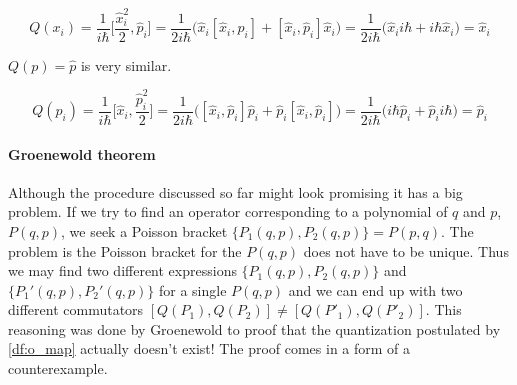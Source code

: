 \begin{equation*}
    Q(x_{i}) = \frac{1}{i \hbar}\bigg[\frac{\hat{x}_{i}^{2}}{2}, \hat{p}_{i}\bigg] = 
    \frac{1}{2 i \hbar} \big(\hat{x}_{i} [\hat{x}_{i}, \hat{p}_{i}] + [\hat{x}_{i}, \hat{p}_{i}] \hat{x}_{i}\big) =
    \frac{1}{2 i \hbar} \big(\hat{x}_{i} i \hbar + i \hbar \hat{x}_{i}\big) = \hat{x}_{i}
\end{equation*}

 $Q(p) = \hat{p}$ is very similar.

\begin{equation*}
    Q(p_{i}) = \frac{1}{i \hbar}\bigg[\hat{x}_{i}, \frac{\hat{p}_{i}^{2}}{2}\bigg] = 
    \frac{1}{2 i \hbar} \big([\hat{x}_{i}, \hat{p}_{i}] \hat{p}_{i} + \hat{p}_{i} [\hat{x}_{i}, \hat{p}_{i}]\big) =
    \frac{1}{2 i \hbar} \big(i \hbar \hat{p}_{i} + \hat{p}_{i} i \hbar \big) = \hat{p}_{i}
\end{equation*}

\paragraph{Groenewold theorem} Although the procedure discussed so far might look promising it has a big problem.
If we try to find an operator corresponding to a polynomial of $q$ and $p$, $P(q, p)$, we seek a Poisson
bracket $\{P_{1}(q, p), P_{2}(q, p)\} = P(p, q)$. The problem is the Poisson bracket for the $P(q, p)$ does
not have to be unique. Thus we may find two different expressions $\{P_{1}(q, p), P_{2}(q, p)\}$ and $\{P_{1}'(q, p), P_{2}'(q, p)\}$
for a single $P(q, p)$ and we can end up with two different commutators $[Q(P_{1}), Q(P_{2})] \neq [Q(P'_{1}), Q(P'_{2})]$.
This reasoning was done by Groenewold to proof that the quantization postulated by \ref{df:o_map} actually doesn't
exist! The proof comes in a form of a counterexample.

